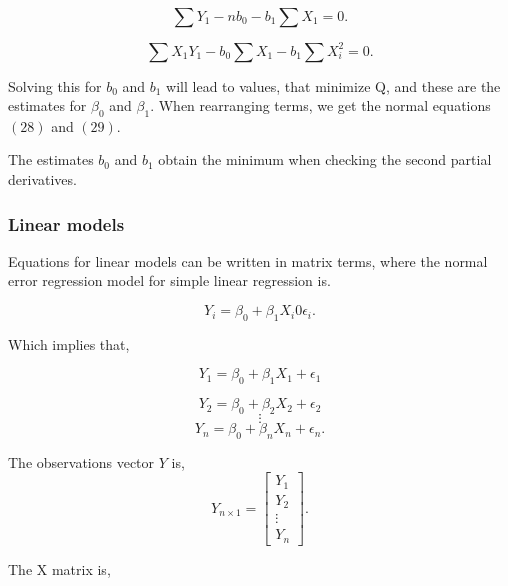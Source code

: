 \begin{equation}
	\sum Y_1 - n b_0 - b_1 \sum X_1 =0 .
\end{equation}

\begin{equation}
	\sum X_1 Y_1  - b_0 \sum X_1 - b_1 \sum X_i^2 =0 .
\end{equation}

\noindent Solving this for $b_0$ and $b_1$ will lead to values, that minimize Q, and these are the estimates for $\beta_0$ and $\beta_1$. 
When rearranging terms, we get the normal equations $(28)$ and $(29)$.

\noindent The estimates $b_0$ and $b_1$ obtain the minimum when checking the second partial derivatives. \newline


\subsubsection{Linear models}

Equations for linear models can be written in matrix terms, where the normal error regression model for simple linear regression is.
 

\begin{equation}
Y_i = \beta_0 + \beta_1 X_i 0 \epsilon_i .
\end{equation}


\noindent Which implies that,

\begin{equation}
Y_1 = \beta_0 + \beta_1 X_1 + \epsilon_1
\end{equation}

\begin{equation}
Y_2 = \beta_0 + \beta_2 X_2 + \epsilon_2
\end{equation}
$$\vdots$$
\begin{equation}
Y_n = \beta_0 + \beta_n X_n + \epsilon_n .
\end{equation}

\noindent The observations vector $Y$ is,
\begin{equation} Y_{n \times 1} =
\left[
\begin{array}{c}
	Y_1 \\ 
	Y_2 \\ 
	\vdots \\
	Y_n 
\end{array}
\right].
\end{equation}

\noindent The X matrix is, 

